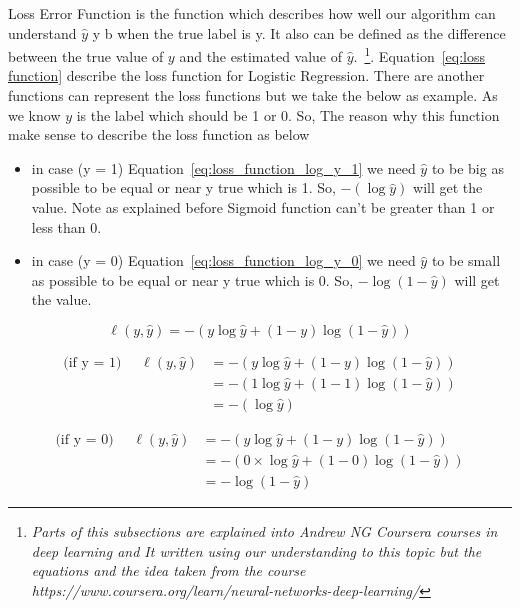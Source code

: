 Loss Error Function is the function which describes how well our algorithm can understand  $\widehat{y}$ y b when the true label is y. It also can be defined as the difference between the true value of $y$ and the estimated value of  $\widehat{y}$.~\footnote{\textit{Parts of this subsections are explained into Andrew NG Coursera courses in deep learning and It written using our understanding to this topic but the equations and the idea taken from the course  https://www.coursera.org/learn/neural-networks-deep-learning/}}. Equation~\eqref{eq:loss function} describe the loss function for Logistic Regression. There are another functions can represent the loss functions but we take the below as example. As we know $y$ is the label which should be 1 or 0. So, The reason why this function make sense to describe the loss function as below
\begin{itemize}
\item in case (y = 1) Equation~\eqref{eq:loss_function_log_y_1} we need $\widehat{y}$ to be big as possible to be equal or near y true which is 1. So, $ - (\log \widehat{y} )$ will get the value. Note as explained before Sigmoid function can't be greater than 1 or less than 0. %
\item in case (y = 0) Equation~\eqref{eq:loss_function_log_y_0} we need $\widehat{y}$ to be small as possible to be equal or near y true which is 0. So, $- \log (1-\widehat{y})$  will get the value.  %
  \end{itemize}
  
\begin{equation}
  \label{eq:loss function}
    \ell(y,\widehat{y}) = - (y \log \widehat{y} + (1-y) \log (1-\widehat{y}))
  \end{equation}

\begin{equation} \label{eq:loss_function_log_y_1}
\begin{split}
  \text{(if y = 1) } \quad  \ell(y,\widehat{y}) & = - (y \log \widehat{y} + (1-y) \log (1-\widehat{y})) \\
  & = - (1 \log \widehat{y} + (1-1) \log (1-\widehat{y}))\\
  & = - (\log \widehat{y} )
\end{split}
\end{equation}


\begin{equation} \label{eq:loss_function_log_y_0}
\begin{split}
  \text{(if y = 0) } \quad  \ell(y,\widehat{y}) & = - (y \log \widehat{y} + (1-y) \log (1-\widehat{y})) \\
  & = - (0 \times \log \widehat{y} + (1-0) \log (1-\widehat{y}))\\
  & = - \log (1-\widehat{y})
\end{split}
\end{equation}




